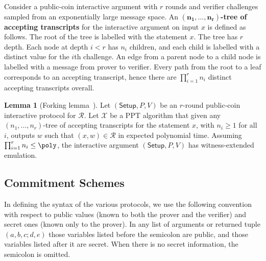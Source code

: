 \documentclass{article}
\theoremstyle{definition}
\newtheorem{lemma}{Lemma}
\begin{document}
Consider a public-coin interactive argument with $r$ rounds and verifier challenges sampled from an exponentially large message space. An \textbf{$\mathbf{(n_1,...,n_r)}$-tree of accepting transcripts} for the interactive argument on input $x$ is defined as follows. The root of the tree is labelled with the statement $x$. The tree has $r$ depth. Each node at depth $i < r$ has $n_i$ children, and each child is labelled with a distinct value for the $i$th challenge. An edge from a parent node to a child node is labelled with a message from prover to verifier. Every path from the root to a leaf corresponds to an accepting transcript, hence there are $\prod_{i=1}^r n_i$ distinct accepting transcripts overall. 

\begin{lemma}[Forking lemma~\cite{EC:BCCGP16}] 
\label{lem:forking}
Let $(\textsf{Setup}, P, V)$ be an $r$-round public-coin interactive protocol for $\mathcal{R}$. Let $\mathcal{X}$ be a PPT algorithm that given any $(n_1,...,n_r)$-tree of accepting transcripts for the statement $x$, with $n_i \geq 1$ for all $i$, outputs $w$ such that $(x, w) \in \mathcal{R}$ in expected polynomial time. Assuming $\prod_{i=1}^r n_i \leq \poly$, the interactive argument $(\textsf{Setup}, P, V)$ has witness-extended emulation. 
\end{lemma}

\subsection{Commitment Schemes}

In defining the syntax of the various protocols, we use the following convention with respect to public values (known to both the prover and the verifier) and secret ones (known only to the prover). In any list of arguments or returned tuple $(a, b, c; d, e)$ those variables listed before the semicolon are public, and those variables listed after it are secret. When there is no secret information, the semicolon is omitted.
\end{document}
